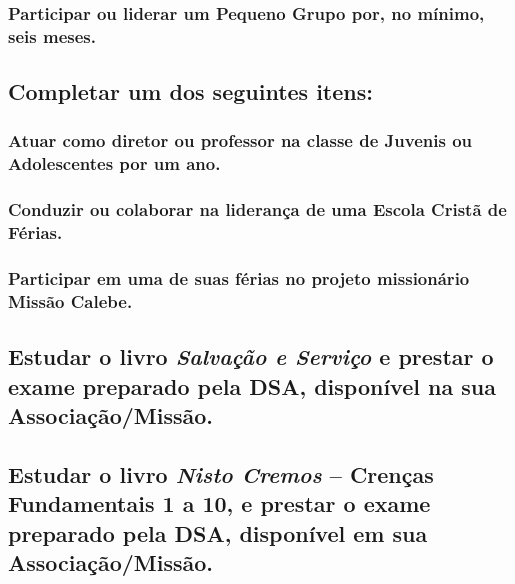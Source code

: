 \subsubsection{Participar ou liderar um Pequeno Grupo por, no mínimo, seis meses.}

\subsection{Completar um dos seguintes itens:}

\subsubsection{Atuar como diretor ou professor na classe de Juvenis ou Adolescentes por um ano.}

\subsubsection{Conduzir ou colaborar na liderança de uma Escola Cristã de Férias.}

\subsubsection{Participar em uma de suas férias no projeto missionário Missão Calebe.}

\subsection{Estudar o livro \emph{Salvação e Serviço} e prestar o exame preparado pela DSA, disponível na sua Associação/Missão.}

\subsection{Estudar o livro \emph{Nisto Cremos} -- Crenças Fundamentais 1 a 10, e prestar o exame preparado pela DSA, disponível em sua Associação/Missão.}
